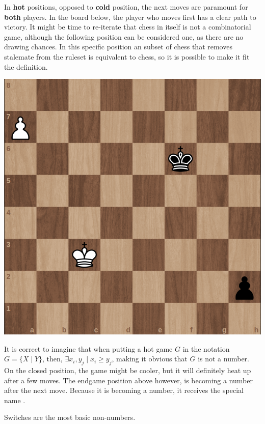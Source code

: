 In \textbf{hot} positions, opposed to \textbf{cold} position, the next moves are paramount for \textbf{both} players. In the board below, the player who moves first has a clear path to victory. It might be time to re-iterate that chess in itself is not a combinatorial game, although the following position can be considered one, as there are no drawing chances. In this specific position an subset of chess that removes stalemate from the ruleset is equivalent to chess, so it is possible to make it fit the definition.

\begin{center}
	\includegraphics[scale=0.15]{images/chess_hot} 
\end{center}

It is correct to imagine that when putting a hot game $G$ in the notation \mbox{$G = \{ X \mid Y\}$}, then, $\exists x_i, y_j \mid x_i \ge y_j$, making it obvious that $G$ is not a number. On the closed position, the game might be cooler, but it will definitely heat up after a few moves. The endgame position above however, is becoming a number after the next move. Because it is becoming a number, it receives the special name .

Switches are the most basic non-numbers.








